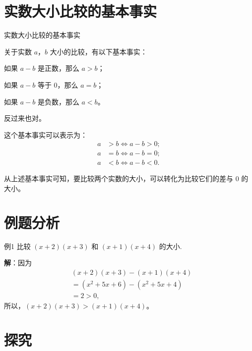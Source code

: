 \documentclass[12pt,
	aspectratio=169,%
	hyperref={colorlinks,
		citecolor=peking_blue,
		urlcolor=peking_blue,
		linkcolor=},
	t,%
	]{beamer}
\begin{document}
\section{实数大小比较的基本事实}

\begin{frame}{实数大小比较的基本事实}
	
关于实数 $a$，$b$ 大小的比较，有以下基本事实：

如果 $a-b$ 是正数，那么 $a>b$；

如果 $a-b$ 等于 $0$，那么 $a=b$；

如果 $a-b$ 是负数，那么 $a<b$。

反过来也对。

\pause
	这个基本事实可以表示为：
\alert{	\begin{align*}
		a &> b \iff a - b > 0; \\
		a &= b \iff a - b = 0; \\
		a &< b \iff a - b < 0.
	\end{align*}}
	
	\pause
	
	从上述基本事实可知，要比较两个实数的大小，可以转化为比较它们的差与 $0$ 的大小。

\end{frame}

\section{例题分析}

\begin{frame}{例1 	比较 $(x+2)(x+3)$ 和 $(x+1)(x+4)$ 的大小.}

\pause	
\textbf{解}：因为
\begin{align*}
	&(x+2)(x+3)-(x+1)(x+4) \\
	&=(x^2+5x+6)-(x^2+5x+4) \\
	&=2>0,
\end{align*}
\pause
所以，$(x +2)(x+3)>(x+1)(x+4)$。
\end{frame}

\section{探究}
\end{document}
